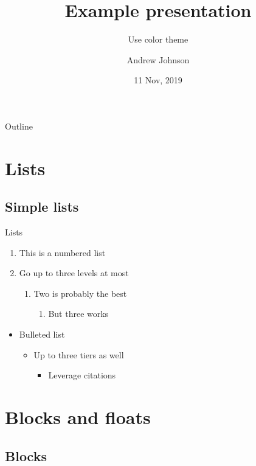 \documentclass{beamer}
\title{Example presentation}
\subtitle{Use color theme}
\author{Andrew Johnson}
\institute[Georgia Tech]{Georgia Institute of Technology}
\date{11 Nov, 2019}
\begin{document}
\frame{\titlepage}

\begin{frame}{Outline}
    \tableofcontents
\end{frame}

\section{Lists}

\frame{\sectionpage}

\subsection{Simple lists}

\begin{frame}{Lists}
    \begin{enumerate}
        \item{This is a numbered list}
        \item{Go up to three levels at most}
            \begin{enumerate}
                \item{Two is probably the best}
                    \begin{enumerate}
                        \item{But three works}
                    \end{enumerate}
            \end{enumerate}
    \end{enumerate}
    \begin{itemize}
        \item{Bulleted list}
            \begin{itemize}
                \item{Up to three tiers as well}
                    \begin{itemize}
                        \item{Leverage citations \cite{burdell_1999}}
                    \end{itemize}
            \end{itemize}
    \end{itemize}
\end{frame}

\section{Blocks and floats}

\subsection{Blocks}
\end{document}
